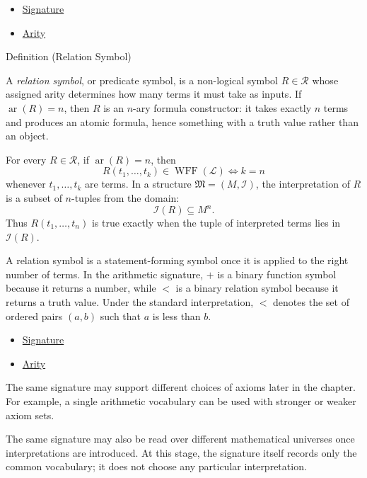 \begin{dependencies}
\begin{itemize}
  \item \hyperref[def:signature]{Signature}
  \item \hyperref[def:arity]{Arity}
\end{itemize}
\end{dependencies}

\begin{definitionbox}{Definition (Relation Symbol)}
\begin{definition}
\label{def:relation-symbol}
A \emph{relation symbol}, or predicate symbol, is a non-logical symbol
$R\in\mathcal{R}$ whose assigned arity determines how many terms it must take
as inputs. If $\operatorname{ar}(R)=n$, then $R$ is an $n$-ary formula
constructor: it takes exactly $n$ terms and produces an atomic formula, hence
something with a truth value rather than an object.
\end{definition}
\end{definitionbox}

\begin{remark*}
For every $R\in\mathcal{R}$, if $\operatorname{ar}(R)=n$, then
\[
  R(t_1,\ldots,t_k)\in\operatorname{WFF}(\mathcal{L})
  \iff k=n
\]
whenever $t_1,\ldots,t_k$ are terms. In a structure
$\mathfrak{M}=(M,\mathcal{I})$, the interpretation of $R$ is a subset of
$n$-tuples from the domain:
\[
  \mathcal{I}(R)\subseteq M^n.
\]
Thus $R(t_1,\ldots,t_n)$ is true exactly when the tuple of interpreted terms
lies in $\mathcal{I}(R)$.
\end{remark*}

\begin{remark*}[Interpretation]
A relation symbol is a statement-forming symbol once it is applied to the
right number of terms. In the arithmetic signature, $+$ is a binary function
symbol because it returns a number, while $<$ is a binary relation symbol
because it returns a truth value. Under the standard interpretation,
$<$ denotes the set of ordered pairs $(a,b)$ such that $a$ is less than $b$.
\end{remark*}

\begin{dependencies}
\begin{itemize}
  \item \hyperref[def:signature]{Signature}
  \item \hyperref[def:arity]{Arity}
\end{itemize}
\end{dependencies}

\begin{remark*}
The same signature may support different choices of axioms later in the
chapter. For example, a single arithmetic vocabulary can be used with stronger
or weaker axiom sets.

The same signature may also be read over different mathematical universes once
interpretations are introduced. At this stage, the signature itself records
only the common vocabulary; it does not choose any particular interpretation.
\end{remark*}
